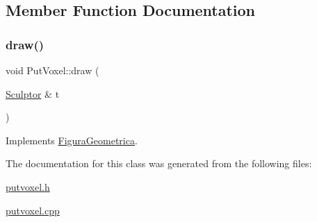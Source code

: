 \subsection{Member Function Documentation}
\mbox{\label{class_put_voxel_af784ab77d8a7aac2010e608796710ccb}} 
\subsubsection{\texorpdfstring{draw()}{draw()}}
{\footnotesize\ttfamily void Put\+Voxel\+::draw (\begin{DoxyParamCaption}\item[{\mbox{\hyperlink{class_sculptor}{Sculptor}} \&}]{t }\end{DoxyParamCaption})\hspace{0.3cm}{\ttfamily [virtual]}}



Implements \mbox{\hyperlink{class_figura_geometrica_a34585fd7c0bd7378fc69c4ee208e676c}{Figura\+Geometrica}}.



The documentation for this class was generated from the following files\+:\begin{DoxyCompactItemize}
\item 
\mbox{\hyperlink{putvoxel_8h}{putvoxel.\+h}}\item 
\mbox{\hyperlink{putvoxel_8cpp}{putvoxel.\+cpp}}\end{DoxyCompactItemize}
